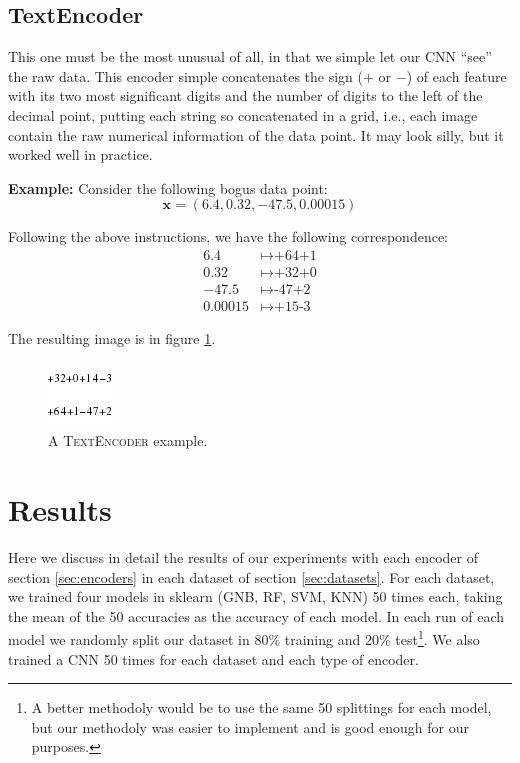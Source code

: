 \documentclass[11pt]{article}
\begin{document}
\subsection{TextEncoder}
This one must be the most unusual of all, in that we simple let our CNN ``see'' the raw data. This encoder simple concatenates the sign ($+$ or $-$) of each feature with its two most significant digits and the number of digits to the left of the decimal point, putting each string so concatenated in a grid, i.e., each image contain the raw numerical information of the data point. It may look silly, but it worked well in practice.

\textbf{Example:} Consider the following bogus data point:
\[
\mathbf{x} = (6.4,0.32, -47.5,0.00015)
\]

Following the above instructions, we have the following correspondence:
\begin{align*}
6.4 &\mapsto \text{+64+1} \\
0.32 &\mapsto \text{+32+0} \\
-47.5 &\mapsto \text{-47+2} \\
0.00015 &\mapsto \text{+15-3}
\end{align*}

The resulting image is in figure \ref{fig:T}.

\begin{figure}[htp]
\centering
\includegraphics[scale=1.0]{text.png}
\caption{A \textsc{TextEncoder} example.}
\label{fig:T}
\end{figure}

\section{Results}

Here we discuss in detail the results of our experiments with each encoder of section \ref{sec:encoders} in each dataset of section \ref{sec:datasets}. For each dataset, we trained four models in sklearn (GNB, RF, SVM, KNN) 50 times each, taking the mean of the 50 accuracies as the accuracy of each model. In each run of each model we randomly split our dataset in $80\%$ training and $20\%$ test\footnote{A better methodoly would be to use the same 50 splittings for each model, but our methodoly was easier to implement and is good enough for our purposes.}. We also trained a CNN 50 times for each dataset and each type of encoder.  
\end{document}
